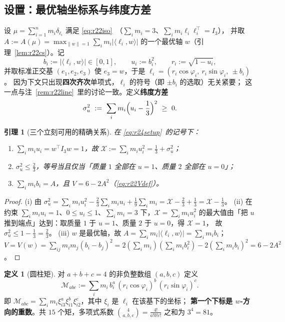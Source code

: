 \documentclass[UTF8,11pt]{ctexart}
\newtheorem{lemma}[theorem]{引理}
\theoremstyle{definition}
\newtheorem{definition}[theorem]{定义}
\begin{document}
\subsection{设置：最优轴坐标系与纬度方差}\label{sec:r24:setup}

设 $\mu=\sum_{i=1}^nm_i\delta_{\ell_i}$ 满足 \eqref{eq:r22iso}~（$\sum_im_i=3$、$\sum_im_i\ell_i\ell_i^\top=I_3$），
并取 $A:=A(\mu)=\max_{\|w\|=1}\sum_im_i|\langle\ell_i,w\rangle|$ 的一个最优轴 $w$（引理~\ref{lem:r22cs}）。记
\begin{equation}\label{eq:r24setup}
b_i:=|\langle\ell_i,w\rangle|\in[0,1],\qquad u_i:=b_i^2,\qquad r_i:=\sqrt{1-u_i},
\end{equation}
并取标准正交基 $(e_1,e_2,e_3)$ 使 $e_3=w$，于是
$\ell_i=(r_i\cos\varphi_i,\ r_i\sin\varphi_i,\ \pm b_i)$。
因为下文只出现\textbf{四次齐次}单项式，$\ell_i$ 的符号（即 $\pm b_i$ 的选取）无关紧要；
这一点与注~\ref{rem:r22line}~里的讨论一致。定义\textbf{纬度方差}
\begin{equation}\label{eq:r24sigu}
\sigma_u^2\ :=\ \sum_im_i\Bigl(u_i-\frac13\Bigr)^2\ \ge\ 0 .
\end{equation}

\begin{lemma}[三个立刻可用的精确关系]\label{lem:r24basic}
在 \eqref{eq:r24setup}~的记号下：
\begin{enumerate}\itemsep2pt
\item[(i)] $\sum_im_iu_i=w^\top I_3w=1$，故
$\mathcal{X}:=\sum_im_iu_i^2=\frac13+\sigma_u^2$；
\item[(ii)] $\sigma_u^2\le\frac23$，等号当且仅当「质量 $1$ 全部在 $u=1$、质量 $2$ 全部在 $u=0$」；
\item[(iii)] $\sum_im_ib_i=A$，且 $V=6-2A^2$（\eqref{eq:r22Vdef}）。
\end{enumerate}
\end{lemma}

\begin{proof}
(i) 由 $\sigma_u^2=\sum_im_iu_i^2-\frac23\sum_im_iu_i+\frac19\sum_im_i
=\mathcal{X}-\frac23+\frac13=\mathcal{X}-\frac13$。
(ii) 在约束 $\sum_im_iu_i=1$、$0\le u_i\le1$、$\sum_im_i=3$ 下，$\mathcal{X}=\sum_im_iu_i^2$
的最大值由「把 $u$ 推到端点」达到：取质量 $1$ 于 $u=1$、质量 $2$ 于 $u=0$，得 $\mathcal{X}=1$，
故 $\sigma_u^2\le1-\frac13=\frac23$。
(iii) $w$ 是最优轴，故 $A=\sum_im_i|\langle\ell_i,w\rangle|=\sum_im_ib_i$；
$V=V(w)=\sum_{ij}m_im_j(b_i-b_j)^2=2(\sum_im_i)(\sum_im_ib_i^2)-2(\sum_im_ib_i)^2=6-2A^2$。
\end{proof}

\begin{definition}[圆柱矩]\label{def:r24mom}
对 $a+b+c=4$ 的非负整数组 $(a,b,c)$ 定义
\begin{equation}\label{eq:r24Mabc}
\mathcal{M}_{abc}:=\sum_im_i\,b_i^{a}\,(r_i\cos\varphi_i)^{b}\,(r_i\sin\varphi_i)^{c}.
\end{equation}
即 $\mathcal{M}_{abc}=\sum_im_i\xi_{i3}^a\xi_{i1}^b\xi_{i2}^c$，其中 $\xi_i$ 是 $\ell_i$ 在该基下的坐标；
\textbf{第一个下标是 $w$-方向的重数}。共 $15$ 个矩，多项式系数
$\binom{4}{a,b,c}=\frac{4!}{a!b!c!}$ 之和为 $3^4=81$。
\end{definition}
\end{document}

